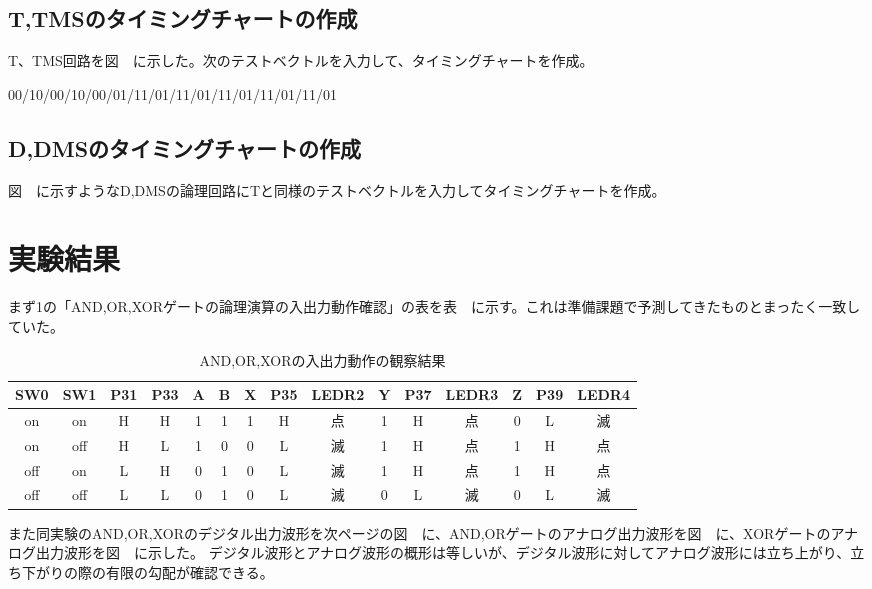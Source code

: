\documentclass[11pt,a4j]{jsarticle}
\begin{document}
  \newpage
  
  \subsection{T,TMSのタイミングチャートの作成}
  T、TMS回路を図\ \ に示した。次のテストベクトルを入力して、タイミングチャートを作成。
  
  00/10/00/10/00/01/11/01/11/01/11/01/11/01/11/01
  
  \subsection{D,DMSのタイミングチャートの作成}
  図\ \ に示すようなD,DMSの論理回路にTと同様のテストベクトルを入力してタイミングチャートを作成。
  
  
  \newpage
  
  
 \section{実験結果}
 まず1の「AND,OR,XORゲートの論理演算の入出力動作確認」の表を表\ \ に示す。これは準備課題で予測してきたものとまったく一致していた。
 
 
  \begin{table}[htb]
  \begin{center}
    \caption{AND,OR,XORの入出力動作の観察結果}
    \begin{tabular}{ccccccccccccccc} \toprule
SW0 & SW1 & P31 & P33 & A & B & X & P35 & LEDR2 & Y & P37 & LEDR3 & Z & P39 & LEDR4 \\ \midrule
on & on & H & H & 1 & 1 & 1 & H & 点 & 1 & H & 点 & 0 & L & 滅 \\
on & off & H & L & 1 & 0 & 0 & L & 滅 & 1 & H & 点 & 1 & H & 点 \\
off & on & L & H & 0 & 1 & 0 & L & 滅 & 1 & H & 点 & 1 & H & 点 \\
off & off & L & L & 0 & 1 & 0 & L & 滅 & 0 & L & 滅 & 0 & L & 滅 \\ \bottomrule
    \end{tabular}
    \label{tab:price}
  \end{center}
  \end{table}
  
  また同実験のAND,OR,XORのデジタル出力波形を次ページの図\ \ に、AND,ORゲートのアナログ出力波形を図\ \ に、XORゲートのアナログ出力波形を図\ \ に示した。
  デジタル波形とアナログ波形の概形は等しいが、デジタル波形に対してアナログ波形には立ち上がり、立ち下がりの際の有限の勾配が確認できる。
  
\end{document}
